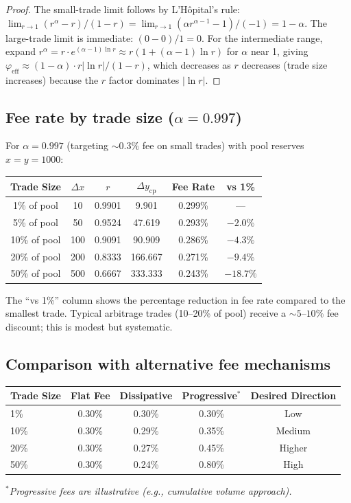 \documentclass[11pt]{article}
\theoremstyle{definition}
\theoremstyle{remark}
\newcommand{\dx}{\Delta x}
\newcommand{\dy}{\Delta y}
\begin{document}
\begin{proof}
The small-trade limit follows by L'H\^{o}pital's rule:
$\lim_{r\to 1}(r^\alpha-r)/(1-r) = \lim_{r\to 1}(\alpha r^{\alpha-1}-1)/(-1)=1-\alpha$.
The large-trade limit is immediate: $(0-0)/1=0$.
For the intermediate range, expand $r^\alpha = r\cdot e^{(\alpha-1)\ln r} \approx r(1+(\alpha-1)\ln r)$ for $\alpha$ near 1, giving $\varphi_{\mathrm{eff}}\approx (1-\alpha)\cdot r|\ln r|/(1-r)$, which decreases as $r$ decreases (trade size increases) because the $r$ factor dominates $|\ln r|$.
\end{proof}

\subsection{Fee rate by trade size ($\alpha=0.997$)}

For $\alpha=0.997$ (targeting $\sim\!0.3\%$ fee on small trades) with pool reserves $x=y=1000$:

\begin{center}
\begin{tabular}{@{}cccccc@{}}
\toprule
\textbf{Trade Size} & $\dx$ & $r$ & $\dy_{\mathrm{cp}}$ & \textbf{Fee Rate} & \textbf{vs 1\%} \\
\midrule
1\% of pool & 10 & 0.9901 & 9.901 & 0.299\% & --- \\
5\% of pool & 50 & 0.9524 & 47.619 & 0.293\% & $-2.0\%$ \\
10\% of pool & 100 & 0.9091 & 90.909 & 0.286\% & $-4.3\%$ \\
20\% of pool & 200 & 0.8333 & 166.667 & 0.271\% & $-9.4\%$ \\
50\% of pool & 500 & 0.6667 & 333.333 & 0.243\% & $-18.7\%$ \\
\bottomrule
\end{tabular}
\end{center}

The ``vs 1\%'' column shows the percentage reduction in fee rate compared to the smallest trade.
Typical arbitrage trades (10--20\% of pool) receive a $\sim\!5\text{--}10\%$ fee discount; this is modest but systematic.

\subsection{Comparison with alternative fee mechanisms}

\begin{center}
\begin{tabular}{@{}lcccc@{}}
\toprule
\textbf{Trade Size} & \textbf{Flat Fee} & \textbf{Dissipative} & \textbf{Progressive}$^*$ & \textbf{Desired Direction} \\
\midrule
1\% & 0.30\% & 0.30\% & 0.30\% & Low \\
10\% & 0.30\% & 0.29\% & 0.35\% & Medium \\
20\% & 0.30\% & 0.27\% & 0.45\% & Higher \\
50\% & 0.30\% & 0.24\% & 0.80\% & High \\
\bottomrule
\end{tabular}
\end{center}
\textit{$^*$Progressive fees are illustrative (e.g., cumulative volume approach).}
\end{document}
